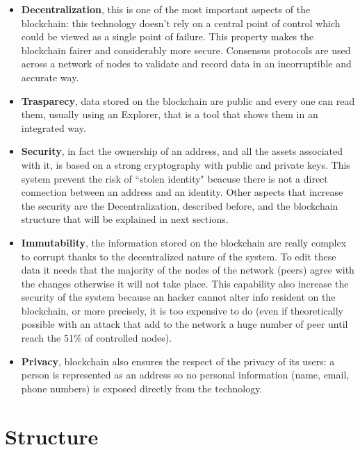 \begin{itemize}
    \item \textbf{Decentralization}, this is one of the most important aspects of the blockchain: this technology doesn’t rely 
    on a central point of control which could be viewed as a single point of failure. This property makes the blockchain 
    fairer and considerably more secure. Consensus protocols are used across a network of nodes to validate and record data in 
    an incorruptible and accurate way.
    
    \item \textbf{Trasparecy}, data stored on the blockchain are public and every one can read them, usually using an Explorer, 
    that is a tool that shows them in an integrated way.

    \item \textbf{Security}, in fact the ownership of an address, and all the assets associated with it, is based on a strong 
    cryptography with public and private keys. This system prevent the risk of ``stolen identity" beacuse there is not a 
    direct connection between an address and an identity. Other aspects that increase the security are the Decentralization, 
    described before, and the blockchain structure that will be explained in next sections.

    \item \textbf{Immutability}, the information stored on the blockchain are really complex to corrupt thanks to the 
    decentralized nature of the system. To edit these data it needs that the majority of the nodes of the network (peers) agree 
    with the changes otherwise it will not take place. This capability also increase the security of the system because an 
    hacker cannot alter info resident on the blockchain, or more precisely, it is too expensive to do (even if theoretically 
    possible with an attack that add to the network a huge number of peer until reach the 51\% of controlled nodes).
    
    \item \textbf{Privacy}, blockchain also ensures the respect of the privacy of its users: a person is represented as an 
    address so no personal information (name, email, phone numbers) is exposed directly from the technology.
\end{itemize}

\section{Structure}
\label{blockchain:structure}

